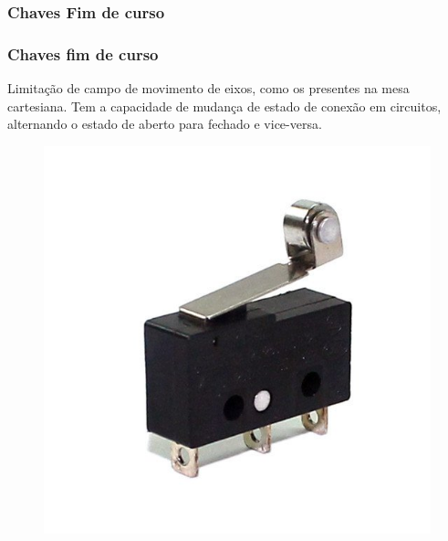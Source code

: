 \subsubsection{Chaves Fim de curso}

\begin{frame}
\frametitle{Chaves fim de curso}

Limitação de campo de movimento de eixos, como os presentes na mesa cartesiana. Tem a capacidade de mudança de estado de conexão em circuitos, alternando o estado de aberto para fechado e vice-versa.

\begin{figure}
\centering
\includegraphics[scale = 0.15]{figuras/chavefimdecurso}
\end{figure}

\end{frame}
